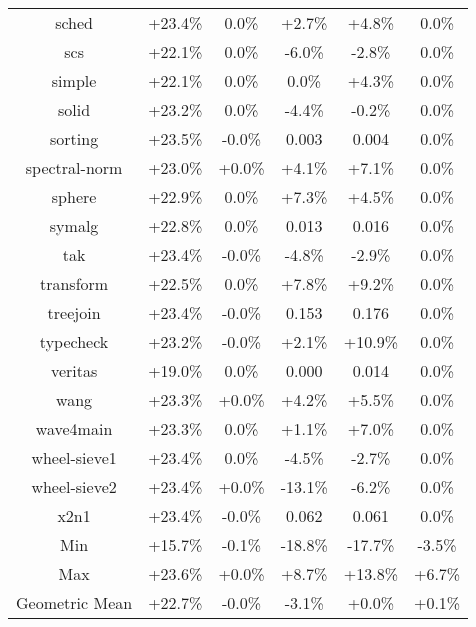 \begin{tabular}{ c c c c c c }
sched & +23.4\% &  0.0\% & +2.7\% & +4.8\% &  0.0\%\\
scs & +22.1\% &  0.0\% & -6.0\% & -2.8\% &  0.0\%\\
simple & +22.1\% &  0.0\% &  0.0\% & +4.3\% &  0.0\%\\
solid & +23.2\% &  0.0\% & -4.4\% & -0.2\% &  0.0\%\\
sorting & +23.5\% & -0.0\% & 0.003 & 0.004 &  0.0\%\\
spectral-norm & +23.0\% & +0.0\% & +4.1\% & +7.1\% &  0.0\%\\
sphere & +22.9\% &  0.0\% & +7.3\% & +4.5\% &  0.0\%\\
symalg & +22.8\% &  0.0\% & 0.013 & 0.016 &  0.0\%\\
tak & +23.4\% & -0.0\% & -4.8\% & -2.9\% &  0.0\%\\
transform & +22.5\% &  0.0\% & +7.8\% & +9.2\% &  0.0\%\\
treejoin & +23.4\% & -0.0\% & 0.153 & 0.176 &  0.0\%\\
typecheck & +23.2\% & -0.0\% & +2.1\% & +10.9\% &  0.0\%\\
veritas & +19.0\% &  0.0\% & 0.000 & 0.014 &  0.0\%\\
wang & +23.3\% & +0.0\% & +4.2\% & +5.5\% &  0.0\%\\
wave4main & +23.3\% &  0.0\% & +1.1\% & +7.0\% &  0.0\%\\
wheel-sieve1 & +23.4\% &  0.0\% & -4.5\% & -2.7\% &  0.0\%\\
wheel-sieve2 & +23.4\% & +0.0\% & -13.1\% & -6.2\% &  0.0\%\\
x2n1 & +23.4\% & -0.0\% & 0.062 & 0.061 &  0.0\%\\
\hline
Min & +15.7\% & -0.1\% & -18.8\% & -17.7\% & -3.5\%\\
Max & +23.6\% & +0.0\% & +8.7\% & +13.8\% & +6.7\%\\
Geometric Mean & +22.7\% & -0.0\% & -3.1\% & +0.0\% & +0.1\%\\


\end{tabular}
